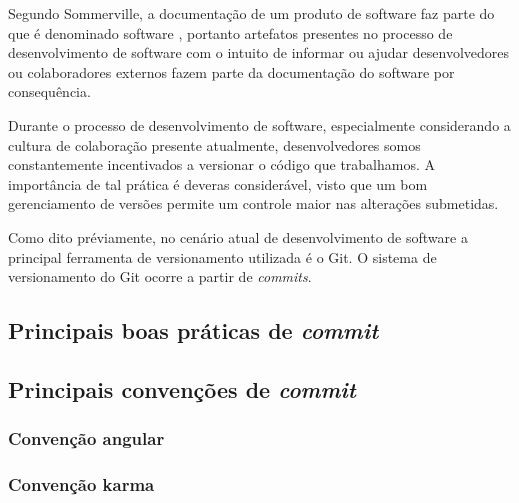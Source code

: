 Segundo Sommerville, a documentação de um produto de software faz parte do que é denominado software \cite{sommerville_o_que_eh_software}, portanto artefatos presentes no processo de desenvolvimento de software com o intuito de informar ou ajudar desenvolvedores ou colaboradores externos fazem parte da documentação do software por consequência.

Durante o processo de desenvolvimento de software, especialmente considerando a cultura de colaboração presente atualmente, desenvolvedores somos constantemente incentivados a versionar o código que trabalhamos.
A importância de tal prática é deveras considerável, visto que um bom gerenciamento de versões permite um controle maior nas alterações submetidas.

Como dito préviamente, no cenário atual de desenvolvimento de software a principal ferramenta de versionamento utilizada é o Git. O sistema de versionamento do Git ocorre a partir de \textit{commits}.



\subsection{Principais boas práticas de \textit{commit}}



\subsection{Principais convenções de \textit{commit}}
\subsubsection{Convenção angular}





\subsubsection{Convenção karma}

